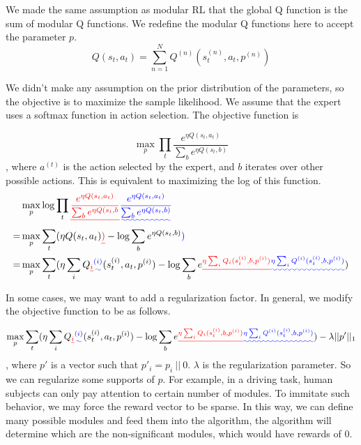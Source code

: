 \documentclass[12pt]{report}	%
\theoremstyle{definition}
\theoremstyle{remark}
\providecommand{\DIFadd}[1]{{\protect\color{blue}\uwave{#1}}} %
\providecommand{\DIFdel}[1]{{\protect\color{red}\sout{#1}}}                      %
\providecommand{\DIFaddbegin}{} %
\providecommand{\DIFaddend}{} %
\providecommand{\DIFdelbegin}{} %
\providecommand{\DIFdelend}{} %
\begin{document}
We made the same assumption as modular RL that the global Q function is the sum
of modular Q functions. We redefine the modular Q functions here to accept the 
parameter $p$\DIFaddbegin \DIFadd{, as follows}\DIFaddend .
\begin{equation}
Q(s_t,a_t) = \sum_{n=1}^{N} Q^{(n)}(s_t^{(n)},a_t,p^{(n)})
\end{equation}

We didn't make any assumption on the prior distribution of the parameters, so
the objective is to maximize the sample likelihood. We assume that the expert
uses a softmax function in action selection. The objective function is

\begin{equation}
\label{eq:irl}
\max_{p} \prod_t \frac{e^{\eta Q(s_t, a_t)}}{\sum_b e^{\eta Q(s_t,
b)}}
\end{equation}, where \DIFdelbegin \DIFdel{$a^{(t)}$ }\DIFdelend \DIFaddbegin \DIFadd{$a_t$ }\DIFaddend is the action selected by the expert, and $b$
iterates over other possible actions. This is equivalent to maximizing the log
of this function.
\begin{align}
&\max_{p} \log \prod_t \DIFdelbegin \DIFdel{\frac{e^{\eta Q(s_t, a_t)}}{\sum_b e^{\eta Q(s_t,
b}}}\DIFdelend \DIFaddbegin \DIFadd{\frac{e^{\eta Q(s_t, a_t)}}{\sum_b e^{\eta Q(s_t,
b)}}}\DIFaddend \\
=&\max_{p} \sum_t (\eta Q(s_t, a_t) \DIFdelbegin \DIFdel{) }\DIFdelend - \log \sum_b e^{\eta Q(s_t, b)}\DIFaddbegin \DIFadd{)
}\DIFaddend \label{eq:irllog}\\
=&\max_{p} \sum_t (\eta \sum_i Q\DIFdelbegin \DIFdel{_i}\DIFdelend \DIFaddbegin \DIFadd{^{(i)}}\DIFaddend (s_t^{(i)}, a_t, p^{(i)}) - \log \sum_b e\DIFdelbegin \DIFdel{^{\eta \sum_i
Q_i(s_t^{(i)}, b, p^{(i)})}}\DIFdelend \DIFaddbegin \DIFadd{^{\eta \sum_i
Q^{(i)}(s_t^{(i)}, b, p^{(i)})}}\DIFaddend )
\end{align}

In some cases, we may want to add a regularization factor. In general, we
modify the objective function to be as follows.

\begin{equation}
\label{eq:irl}
\max_{p} \sum_t (\eta \sum_i Q\DIFdelbegin \DIFdel{_i}\DIFdelend \DIFaddbegin \DIFadd{^{(i)}}\DIFaddend (s_t^{(i)}, a_t, p^{(i)}) - \log \sum_b e\DIFdelbegin \DIFdel{^{\eta \sum_i
Q_i(s_t^{(i)}, b, p^{(i)})}}\DIFdelend \DIFaddbegin \DIFadd{^{\eta \sum_i
Q^{(i)}(s_t^{(i)}, b, p^{(i)})}}\DIFaddend )
- \lambda ||p'||_1
\end{equation},
where $p'$ is a vector such that $p'_i = p_i\ ||\ 0$. $\lambda$ is the
regularization parameter. So we can regularize some supports of $p$. For
example, in a driving task, human subjects can only pay attention to \DIFaddbegin \DIFadd{a }\DIFaddend certain
number of modules. To immitate such behavior, we may force the reward vector to
be sparse. In this way, we can define many possible modules and feed them into the
algorithm, the algorithm will determine which are the non-significant modules,
which would have rewards of 0.
\end{document}

